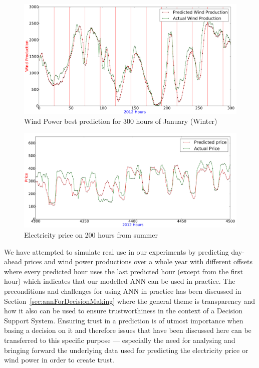 \begin{figure}[H]
\centering
\includegraphics[width=0.99\linewidth]{billeder/bestPossiblePredictionWindProduction0-300.png}
\caption{Wind Power best prediction for 300 hours of January (Winter)}
\label{fig:abilityToPredictWindPower}
\end{figure}

\begin{figure}[H]
\centering
\includegraphics[width=\linewidth]{billeder/PriceExperimentalAnalysis/summer.jpg}
\caption{Electricity price on 200 hours from summer}
\label{fig:abilityToPredictElectricityPrice}
\end{figure}

We have attempted to simulate real use in our experiments by predicting day-ahead prices and wind power productions over a whole year with different offsets where every predicted hour uses the last predicted hour (except from the first hour) which indicates that our modelled ANN can be used in practice. The preconditions and challenges for using ANN in practice has been discussed in Section~\ref{sec:annForDecisionMaking} where the general theme is transparency and how it also can be used to ensure trustworthiness in the context of a Decision Support System. Ensuring trust in a prediction is of utmost importance when basing a decision on it and therefore issues that have been discussed here can be transferred to this specific purpose --- especially the need for analysing and bringing forward the underlying data used for predicting the electricity price or wind power in order to create trust.
 
